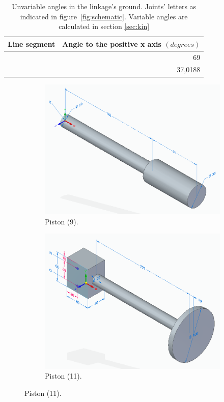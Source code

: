 \documentclass[a4paper]{article}
\begin{document}
\begin{table} 
	\centering
	\begin{tabular}{lr}
		\hline
		Line segment & Angle to the positive x axis \((\si{degrees})\) \\
		\hline
		[AE] & 69 \\
		\text{[AF]} & 37,0188 \\
		\hline
	\end{tabular}
	\caption{Unvariable angles in the linkage's ground. Joints' letters as indicated in figure~\ref{fig:schematic}. Variable angles are calculated in section \ref{sec:kin}}
	\label{tab:angles}
\end{table}


\begin{figure}
	\centering
	
	\begin{subfigure}[b]{.4\textwidth}
		\centering
		\label{fig:piston9}
		\includegraphics[width=\textwidth]{piston9.png}
		\caption{Piston (9).\centering}
	\end{subfigure}
	\hfill
	\begin{subfigure}[b]{.4\textwidth}
		\centering
		\label{fig:piston11}
		\includegraphics[width=\textwidth]{piston11.png}
		\caption{Piston (11).\centering}
	\end{subfigure}


\end{figure}
\end{document}
